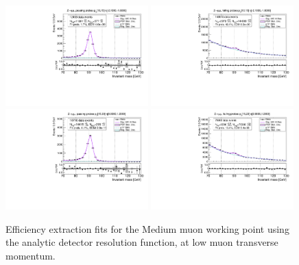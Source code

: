 {\begin{figure}
\centering
\includegraphics[width=0.49\textwidth]{figures/Zmm_ResFunc_BkgLPi_pass_ptBin0_etaBin1.pdf}
\includegraphics[width=0.49\textwidth]{figures/Zmm_ResFunc_BkgLPi_fail_ptBin0_etaBin1.pdf}
\includegraphics[width=0.49\textwidth]{figures/Zmm_ResFunc_BkgLPi_pass_ptBin1_etaBin9.pdf}
\includegraphics[width=0.49\textwidth]{figures/Zmm_ResFunc_BkgLPi_fail_ptBin1_etaBin9.pdf}
\caption{Efficiency extraction fits for the Medium muon working point using the analytic detector resolution function, at low muon transverse momentum.}
\label{fig:ZmmAltSigResFits1}
\end{figure}

}
